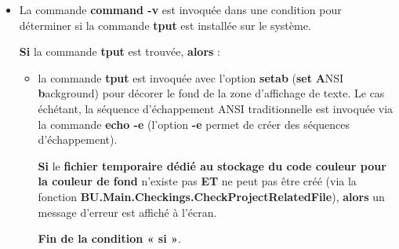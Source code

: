 \documentclass[a4paper,10pt]{article}
\begin{document}
    \begin{itemize}
        \item
        {
            \begin{justify}
                La commande \textbf{\color{cmds}command -v} est invoquée dans une condition pour déterminer si la commande \textbf{\color{cmds}tput} est installée sur le système.
            \end{justify}

            \setlength{\parskip}{1em}

            \begin{justify}
                \textbf{\color{cond}Si} la commande \textbf{\color{cmds}tput} est trouvée, \textbf{\color{cond}alors} :

                \begin{itemize}
                    \item
                    {
                        \begin{justify}
                            la commande \textbf{\color{cmds}tput} est invoquée avec l'option \textbf{\color{cmds}setab} (\textbf{set} \textbf{A}NSI \textbf{b}ackground) pour décorer le fond de la zone d'affichage de texte. Le cas échétant, la séquence d'échappement ANSI traditionnelle est invoquée via la commande \textbf{\color{cmds}echo -e} (l'option \textbf{\color{cmds}-e} permet de créer des séquences d'échappement).
                        \end{justify}

                        \setlength{\parskip}{2em}

                        \begin{justify}
                            \textbf{\color{cond}Si} le \textbf{\color{path}fichier temporaire dédié au stockage du code couleur pour la couleur de fond} n'existe pas \textbf{ET} ne peut pas être créé (via la fonction \textbf{\color{func}BU.Main.Checkings.CheckProjectRelatedFile}), \textbf{\color{cond}alors} un message d'erreur est affiché à l'écran.
                        \end{justify}

                        \setlength{\parskip}{1em}

                        \begin{justify}
                            \textbf{\color{cond}Fin de la condition « si »}.
                        \end{justify}
                    }
                \end{itemize}
            \end{justify}

}
\end{itemize}
\end{document}
